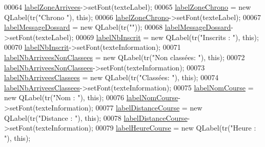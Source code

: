 \begin{DoxyCode}
00064     \hyperlink{class_i_h_m_chrono_cross_a56f6c02a8d3274c4359f12709cefa5d2}{labelZoneArrivees}->setFont(texteLabel);
00065     \hyperlink{class_i_h_m_chrono_cross_ad28922f5316673a1e181747879ef6855}{labelZoneChrono} = \textcolor{keyword}{new} QLabel(tr(\textcolor{stringliteral}{"Chrono "}), \textcolor{keyword}{this});
00066     \hyperlink{class_i_h_m_chrono_cross_ad28922f5316673a1e181747879ef6855}{labelZoneChrono}->setFont(texteLabel);
00067     \hyperlink{class_i_h_m_chrono_cross_abd23647486d38e6f57aef1faf50757af}{labelMessageDossard} = \textcolor{keyword}{new} QLabel(tr(\textcolor{stringliteral}{""}));
00068     \hyperlink{class_i_h_m_chrono_cross_abd23647486d38e6f57aef1faf50757af}{labelMessageDossard}->setFont(texteLabel);
00069     \hyperlink{class_i_h_m_chrono_cross_a9d410e8bc161481a83298176b2702519}{labelNbInscrit} = \textcolor{keyword}{new} QLabel(tr(\textcolor{stringliteral}{"Inscrits : "}), \textcolor{keyword}{this});
00070     \hyperlink{class_i_h_m_chrono_cross_a9d410e8bc161481a83298176b2702519}{labelNbInscrit}->setFont(texteInformation);
00071     \hyperlink{class_i_h_m_chrono_cross_a3249b3528e5b75353bb8fb80d27eefe3}{labelNbArriveesNonClassees} = \textcolor{keyword}{new} QLabel(tr(\textcolor{stringliteral}{"Non classées: "}), \textcolor{keyword}{this});
00072     \hyperlink{class_i_h_m_chrono_cross_a3249b3528e5b75353bb8fb80d27eefe3}{labelNbArriveesNonClassees}->setFont(texteInformation);
00073     \hyperlink{class_i_h_m_chrono_cross_a08fd415de59fe6f42663f3f36f074e61}{labelNbArriveesClassees} = \textcolor{keyword}{new} QLabel(tr(\textcolor{stringliteral}{"Classées: "}), \textcolor{keyword}{this});
00074     \hyperlink{class_i_h_m_chrono_cross_a08fd415de59fe6f42663f3f36f074e61}{labelNbArriveesClassees}->setFont(texteInformation);
00075     \hyperlink{class_i_h_m_chrono_cross_aebe86f4e614f568db5558bf99f1b44e6}{labelNomCourse} = \textcolor{keyword}{new} QLabel(tr(\textcolor{stringliteral}{"Nom : "}), \textcolor{keyword}{this});
00076     \hyperlink{class_i_h_m_chrono_cross_aebe86f4e614f568db5558bf99f1b44e6}{labelNomCourse}->setFont(texteInformation);
00077     \hyperlink{class_i_h_m_chrono_cross_a4748740a4973bf62c408be380ac0ae77}{labelDistanceCourse} = \textcolor{keyword}{new} QLabel(tr(\textcolor{stringliteral}{"Distance : "}), \textcolor{keyword}{this});
00078     \hyperlink{class_i_h_m_chrono_cross_a4748740a4973bf62c408be380ac0ae77}{labelDistanceCourse}->setFont(texteInformation);
00079     \hyperlink{class_i_h_m_chrono_cross_ad071b8c6ecc126fca3e17e58e83942d9}{labelHeureCourse} = \textcolor{keyword}{new} QLabel(tr(\textcolor{stringliteral}{"Heure : "}), \textcolor{keyword}{this});

\end{DoxyCode}

